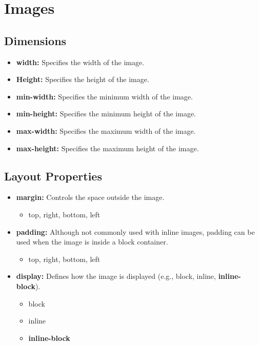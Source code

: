 \documentclass{report}
\begin{document}
    \pagebreak \bigbreak \noindent 
    \section{\LARGE Images}
    \bigbreak \noindent 
    \subsection{Dimensions}
    \begin{itemize}
        \item \textbf{width:} Specifies the width of the image.
        \item \textbf{Height:} Specifies the height of the image.
        \item \textbf{min-width:} Specifies the minimum width of the image.
        \item \textbf{min-height:} Specifies the minimum height of the image.
        \item \textbf{max-width:} Specifies the maximum width of the image.
        \item \textbf{max-height:} Specifies the maximum height of the image.
    \end{itemize}
    \bigbreak \noindent 
    \subsection{Layout Properties}
    \begin{itemize}
        \item \textbf{margin:} Controls the space outside the image.
            \begin{itemize}
                \item top, right, bottom, left
            \end{itemize}
        \item \textbf{padding:} Although not commonly used with inline images, padding can be used when the image is inside a block container.
            \begin{itemize}
                \item top, right, bottom, left
            \end{itemize}
        \item \textbf{display:} Defines how the image is displayed (e.g., block, inline, \textbf{inline-block}).  
            \begin{itemize}
                \item block
                \item inline
                \item \textbf{inline-block}
            \end{itemize}
    \end{itemize}
    \bigbreak \noindent 
\end{document}
